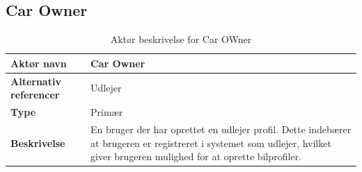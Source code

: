 \documentclass[Kravspecifikation/Kravspec_Main.tex]{subfiles}
\begin{document}
\subsection{Car Owner}
\begin{table}[H]
    \centering
    \begin{tabular}{|L{0.35\textwidth}|L{0.65\textwidth}|}
        \hline
        \textbf{Aktør navn} & Car Owner \\ \hline
        \textbf{Alternativ referencer} & Udlejer \\ \hline
        \textbf{Type} & Primær \\ \hline
        \textbf{Beskrivelse} & En bruger der har oprettet en udlejer profil. Dette indebærer at brugeren er registreret i systemet som udlejer, hvilket giver brugeren mulighed for at oprette bilprofiler. \\ \hline
    \end{tabular}
    \caption{Aktør beskrivelse for Car OWner}
    \label{tab:CarOwnerBeskrivelse}
\end{table}
\end{document}
